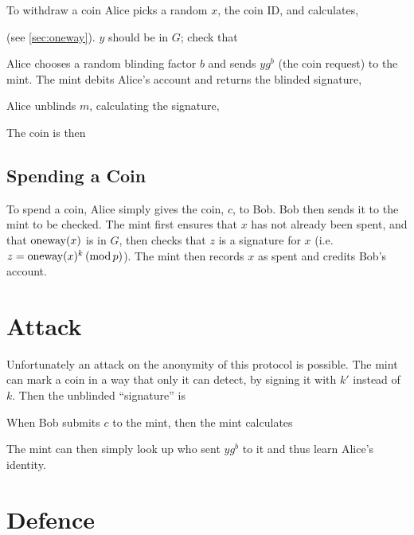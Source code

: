 \documentclass[a4paper,titlepage]{article}
\begin{document}
To withdraw a coin Alice picks a random $x$, the coin ID, and
calculates,


(see \ref{sec:oneway}). $y$ should be in $G$; check that


Alice chooses a random blinding factor $b$ and sends $y g^b$ (the coin
request) to the mint. The mint debits Alice's account and returns the
blinded signature,


Alice unblinds $m$, calculating the signature,


The coin is then


\subsection{Spending a Coin}

To spend a coin, Alice simply gives the coin, $c$, to Bob. Bob then
sends it to the mint to be checked. The mint first ensures that $x$
has not already been spent, and that $\textrm{oneway}(x)$ is in $G$, then checks that
$z$ is a signature for $x$ (i.e. $z=\textrm{oneway}(x)^k \,(\textrm{mod}\,p)$). The mint
then records $x$ as spent and credits Bob's account.

\section{Attack}

Unfortunately an attack on the anonymity of this protocol is
possible. The mint can mark a coin in a way that only it can detect,
by signing it with $k'$ instead of $k$. Then the unblinded
``signature'' is


When Bob submits $c$ to the mint, then the mint calculates


The mint can then simply look up who sent $y g^b$ to it and thus learn
Alice's identity.

\section{Defence}
\end{document}

